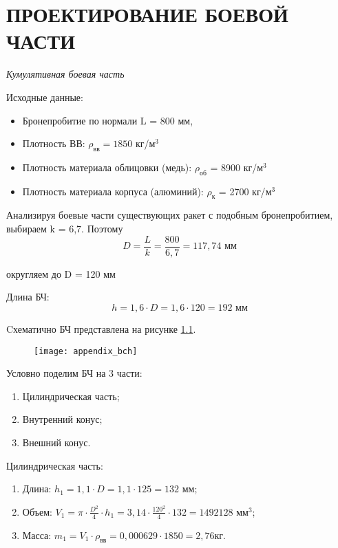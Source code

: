 \chapter{ПРОЕКТИРОВАНИЕ БОЕВОЙ ЧАСТИ}
\label{cha:appendix_bch}
\emph{Кумулятивная боевая часть}

Исходные данные:
\begin{itemize}
	\item Бронепробитие по нормали 				L = 800 мм,
	\item Плотность ВВ:							$\rho_\text{вв} = 1850$ кг/$\text{м}^3$
	\item Плотность материала облицовки (медь):			$\rho_\text{об}$ = 8900 кг/$\text{м}^3$
	\item Плотность материала корпуса (алюминий):		$\rho_\text{к}$ = 2700 кг/$\text{м}^3$
\end{itemize}

Анализируя боевые части существующих ракет с подобным бронепробитием, выбираем k = 6,7. Поэтому 
$$ D=\frac{L}{k}=\frac{800}{6,7}=117,74 \text{ мм}$$

округляем до D = 120 мм

Длина БЧ:		$$ h=1,6 \cdot D=1,6 \cdot 120=192 \text{ мм}$$

Cхематично БЧ представлена на рисунке \ref{fig:appendix_bch}.
\begin{figure}
	\begin{center}
		\texttt{[image: appendix\_bch]}
		\caption{}
		\label{fig:appendix_bch}
	\end{center}
\end{figure}

\clearpage
Условно поделим БЧ на 3 части:
\begin{enumerate}
	\item Цилиндрическая часть;
	\item Внутренний конус;
	\item Внешний конус.
\end{enumerate}

Цилиндрическая часть: 
\begin{enumerate}
	\item Длина: 	$h_1=1,1 \cdot D=1,1 \cdot 125 =132$ мм;
	\item Объем: 	$V_1=\pi \cdot \frac{D^2}{4} \cdot h_1=3,14 \cdot \frac{120^2}{4} \cdot 132 = 1492128 \text{ мм}^3 $;
	\item Масса:	$m_1=V_1 \cdot \rho_\text{вв}=0,000629 \cdot 1850=2,76 кг$.
\end{enumerate}


